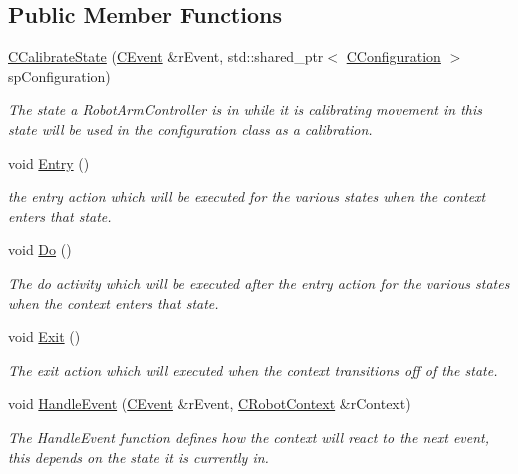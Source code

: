 \subsection*{Public Member Functions}
\begin{DoxyCompactItemize}
\item 
\hyperlink{classCCalibrateState_aac8ef64d3e1d849d6e0dee9d219585b6}{C\+Calibrate\+State} (\hyperlink{classCEvent}{C\+Event} \&r\+Event, std\+::shared\+\_\+ptr$<$ \hyperlink{classCConfiguration}{C\+Configuration} $>$ sp\+Configuration)
\begin{DoxyCompactList}\small\item\em The state a Robot\+Arm\+Controller is in while it is calibrating movement in this state will be used in the configuration class as a calibration. \end{DoxyCompactList}\item 
void \hyperlink{classCCalibrateState_a361368643bad182ed1a78ee1d1a820e5}{Entry} ()
\begin{DoxyCompactList}\small\item\em the entry action which will be executed for the various states when the context enters that state. \end{DoxyCompactList}\item 
void \hyperlink{classCCalibrateState_a2b2ad369ae655704fadcffb0a4b9fca2}{Do} ()
\begin{DoxyCompactList}\small\item\em The do activity which will be executed after the entry action for the various states when the context enters that state. \end{DoxyCompactList}\item 
void \hyperlink{classCCalibrateState_a0bdb13da2af72f1e8e814a365f8d765a}{Exit} ()
\begin{DoxyCompactList}\small\item\em The exit action which will executed when the context transitions off of the state. \end{DoxyCompactList}\item 
void \hyperlink{classCCalibrateState_af24b30b6357a7b48f1157afdc0662984}{Handle\+Event} (\hyperlink{classCEvent}{C\+Event} \&r\+Event, \hyperlink{classCRobotContext}{C\+Robot\+Context} \&r\+Context)
\begin{DoxyCompactList}\small\item\em The Handle\+Event function defines how the context will react to the next event, this depends on the state it is currently in. \end{DoxyCompactList}\end{DoxyCompactItemize}


